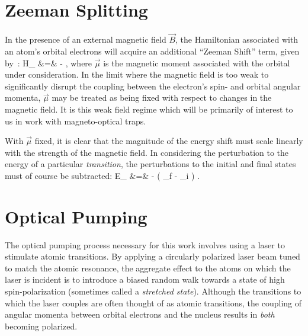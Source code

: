 \section{Zeeman Splitting}
\label{sec:zeemansplitting}
In the presence of an external magnetic field $\vec{B}$, the Hamiltonian associated with an atom's orbital electrons will acquire an additional ``Zeeman Shift'' term, given by~\cite{corney}:
\bea
\label{zeeman_hamiltonian}
H_{} &=& - \vec{\mu}\cdot {},
\eea
where $\vec{\mu}$ is the magnetic moment associated with the orbital under consideration.  In the limit where the magnetic field is too weak to significantly disrupt the coupling between the electron's spin- and orbital angular momenta, $\vec{\mu}$ may be treated as being fixed with respect to changes in the magnetic field.  It is this weak field regime which will be primarily of interest to us in work with magneto-optical traps.


With $\vec{\mu}$ fixed, it is clear that the magnitude of the energy shift must scale linearly with the strength of the magnetic field.  In considering the perturbation to the energy of a particular \emph{transition}, the perturbations to the initial and final states must of course be subtracted:
\bea
\Delta E_{} &=& - \left( \vec{\mu}_f - \vec{\mu}_i \right) \cdot {}.
\eea 







\section{Optical Pumping}
\label{sec:op}
The optical pumping process necessary for this work involves using a laser to stimulate atomic transitions.  By applying a circularly polarized laser beam tuned to match the atomic resonance, the aggregate effect to the atoms on which the laser is incident is to introduce a biased random walk towards a state of high spin-polarization (sometimes called a \emph{stretched state}).  Although the transitions to which the laser couples are often thought of as atomic transitions, the coupling of angular momenta between orbital electrons and the nucleus results in \emph{both} becoming polarized.  

